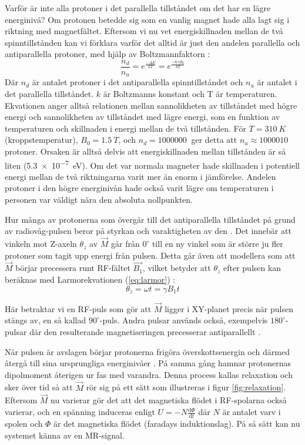 \documentclass[11pt, a4paper]{article}
\begin{document}
Varför är inte alla protoner i det parallella tillståndet om det har en lägre energinivå? Om protonen betedde sig som en vanlig magnet hade alla lagt sig i riktning med magnetfältet. Eftersom vi nu vet energiskillnaden mellan de två spinntillstånden kan vi förklara varför det alltid är just den andelen parallella och antiparallella protoner, med hjälp av Boltzmannfaktorn \parencite[s. 90]{mri_lärobok}:
\begin{equation}
	\frac{n_d}{n_u}=e^\frac{-\Delta E}{kT}=e^\frac{-\hbar\gamma B_0}{kT}
\end{equation}
Där $n_d$ är antalet protoner i det antiparallella spinntillståndet och $n_u$ är antalet i det parallella tillståndet. $k$ är Boltzmanns konstant och T är temperaturen. Ekvationen anger alltså relationen mellan sannolikheten av tillståndet med högre energi och sannolikheten av tillståndet med lägre energi, som en funktion av temperaturen och skillnaden i energi mellan de två tillstånden. För $T=\SI{310}{K}$ (kroppstemperatur), $B_0=\SI{1.5}{T}$, och $n_d=\SI{1000000}{}$ ger detta att $n_u\approx\SI{1000010}{}$ protoner. Orsaken är alltså delvis att energiskillnaden mellan tillstånden är så liten (\SI{5.3e-7}{eV}). Om det var normala magneter hade skillnaden i potentiell energi mellan de två riktningarna varit mer än enorm i jämförelse. Andelen protoner i den högre energinivån hade också varit lägre om temperaturen i personen var väldigt nära den absoluta nollpunkten.

Hur många av protonerna som övergår till det antiparallella tillståndet på grund av radiovåg-pulsen beror på styrkan och varaktigheten av den \parencite{mri_for_radiologists}. Det innebär att vinkeln mot Z-axeln $\theta_z$ av $\vec{M}$ går från $0^\circ$ till en ny vinkel som är större ju fler protoner som tagit upp energi från pulsen. Detta går även att modellera som att $\vec{M}$ börjar precessera runt RF-fältet $\vec{B_1}$, vilket betyder att $\theta_z$ efter pulsen kan beräknas med Larmorekvationen (\ref{eq:larmor}) \parencite[s. 45]{mri_lärobok}:
\begin{equation}
	\theta_z=\omega t=\gamma B_1t
\end{equation}

Här betraktar vi en RF-puls som gör att $\vec{M}$ ligger i XY-planet precis när pulsen stängs av, en så kallad $90^\circ$-puls. Andra pulsar används också, exempelvis $180^\circ$-pulsar där den resulterande magnetiseringen precesserar antiparallellt \parencite{mri_for_radiologists}.

När pulsen är avslagen börjar protonerna frigöra överskottsenergin och därmed återgå till sina ursprungliga energinivåer \parencite{understanding_mri}. På samma gång hamnar protonernas dipolmoment återigen ur fas med varandra. Denna process kallas relaxation och sker över tid så att $\vec{M}$ rör sig på ett sätt som illustreras i figur \ref{fig:relaxation}. Eftersom $\vec{M}$ nu varierar gör det att det magnetiska flödet i RF-spolarna också varierar, och en spänning induceras enligt $U=-N\frac{\mathrm{d}\Phi}{\mathrm{d}t}$ där $N$ är antalet varv i spolen och $\Phi$ är det magnetiska flödet (faradays induktionslag). På så sätt kan nu systemet känna av en MR-signal.
\end{document}
